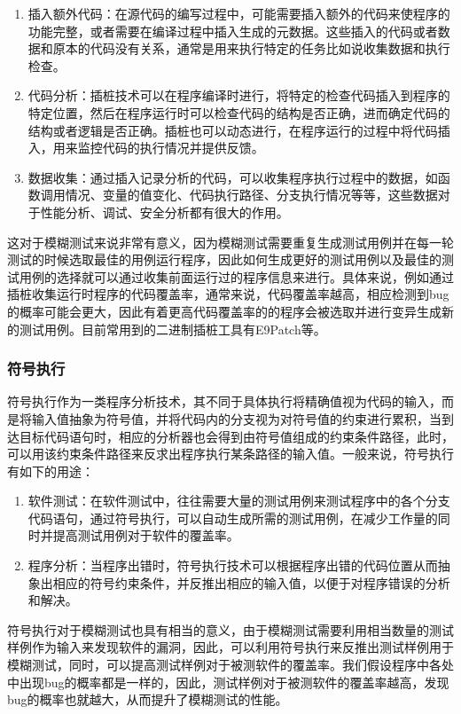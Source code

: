 \begin{enumerate}
\item 插入额外代码：在源代码的编写过程中，可能需要插入额外的代码来使程序的功能完整，或者需要在编译过程中插入生成的元数据。这些插入的代码或者数据和原本的代码没有关系，通常是用来执行特定的任务比如说收集数据和执行检查。
\item 代码分析：插桩技术可以在程序编译时进行，将特定的检查代码插入到程序的特定位置，然后在程序运行时可以检查代码的结构是否正确，进而确定代码的结构或者逻辑是否正确。插桩也可以动态进行，在程序运行的过程中将代码插入，用来监控代码的执行情况并提供反馈。
\item 数据收集：通过插入记录分析的代码，可以收集程序执行过程中的数据，如函数调用情况、变量的值变化、代码执行路径、分支执行情况等等，这些数据对于性能分析、调试、安全分析都有很大的作用。
\end{enumerate}

这对于模糊测试来说非常有意义，因为模糊测试需要重复生成测试用例并在每一轮测试的时候选取最佳的用例运行程序，因此如何生成更好的测试用例以及最佳的测试用例的选择就可以通过收集前面运行过的程序信息来进行。具体来说，例如通过插桩收集运行时程序的代码覆盖率，通常来说，代码覆盖率越高，相应检测到bug的概率可能会更大，因此有着更高代码覆盖率的的程序会被选取并进行变异生成新的测试用例。目前常用到的二进制插桩工具有E9Patch\cite{duck2020binary}等。

\subsubsection{符号执行}

符号执行\cite{schwartz2010all, cadar2013symbolic}作为一类程序分析技术，其不同于具体执行将精确值视为代码的输入，而是将输入值抽象为符号值，并将代码内的分支视为对符号值的约束进行累积，当到达目标代码语句时，相应的分析器也会得到由符号值组成的约束条件路径，此时，可以用该约束条件路径来反求出程序执行某条路径的输入值。一般来说，符号执行有如下的用途：

\begin{enumerate}
\item 软件测试：在软件测试中，往往需要大量的测试用例来测试程序中的各个分支代码语句，通过符号执行，可以自动生成所需的测试用例，在减少工作量的同时并提高测试用例对于软件的覆盖率。
\item 程序分析：当程序出错时，符号执行技术可以根据程序出错的代码位置从而抽象出相应的符号约束条件，并反推出相应的输入值，以便于对程序错误的分析和解决。
\end{enumerate}

符号执行对于模糊测试也具有相当的意义，由于模糊测试需要利用相当数量的测试样例作为输入来发现软件的漏洞，因此，可以利用符号执行来反推出测试样例用于模糊测试，同时，可以提高测试样例对于被测软件的覆盖率。我们假设程序中各处中出现bug的概率都是一样的，因此，测试样例对于被测软件的覆盖率越高，发现bug的概率也就越大，从而提升了模糊测试的性能。

